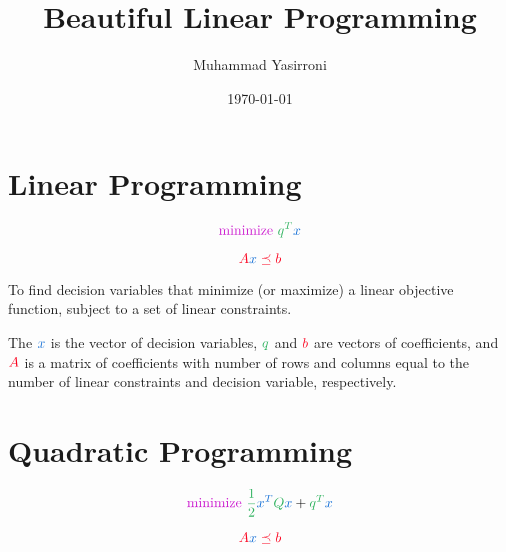 \documentclass{article}
\title{Beautiful Linear Programming}
\author{Muhammad Yasirroni}
\date{\today}
\begin{document}
\maketitle

\section{Linear Programming}


\begin{equation}
    \textcolor{opt}{\text{minimize~}}
    \color{obj} q^T
    \color{var} x
    \color{eq}
\end{equation}

\begin{equation}
    \color{const} A
    \color{var} x
    \color{const} \preceq b
    \color{eq}
\end{equation}

To find \textcolor{var}{decision variables} that \textcolor{opt}{minimize} (or \textcolor{opt}{maximize}) a \textcolor{obj}{linear objective function}, subject to a set of \textcolor{const}{linear constraints}.

The $\color{var} x$ is the vector of decision variables, $\color{obj} q$ and $\color{const} b$ are vectors of coefficients, and $\color{const} A$ is a matrix of coefficients with number of rows and columns equal to the number of \textcolor{const}{linear constraints} and \textcolor{var}{decision variable}, respectively.

\section{Quadratic Programming}


\begin{equation}
    \textcolor{opt}{\text{minimize~}}
    \color{obj} \frac{1}{2} 
    \color{var} x^T
    \color{obj} Q
    \color{var} x
    \color{eq} + 
    \color{obj} q^T
    \color{var} x
    \color{eq}
\end{equation}

\begin{equation}
    \color{const} A
    \color{var} x
    \color{const} \preceq b
    \color{eq}
\end{equation}
\end{document}
